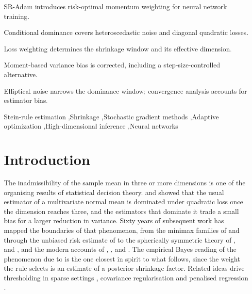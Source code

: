 \documentclass[a4paper,fleqn]{cas-dc}
\theoremstyle{plain}
\theoremstyle{definition}
\theoremstyle{remark}
\begin{document}
\begin{highlights}

\item SR-Adam introduces risk-optimal momentum weighting for neural network training.

\item Conditional dominance covers heteroscedastic noise and diagonal quadratic losses.

\item Loss weighting determines the shrinkage window and its effective dimension.

\item Moment-based variance bias is corrected, including a step-size-controlled alternative.

\item Elliptical noise narrows the dominance window; convergence analysis accounts for estimator bias.

\end{highlights}
\begin{keywords}
Stein-rule estimation \sep Shrinkage \sep Stochastic gradient methods \sep Adaptive optimization \sep High-dimensional inference \sep Neural networks
\end{keywords}

\maketitle


\section{Introduction}
\label{sec:introduction}

The inadmissibility of the sample mean in three or more dimensions is one of the organising results of statistical decision theory. \citet{stein1956} and \citet{james1961} showed that the usual estimator of a multivariate normal mean is dominated under quadratic loss once the dimension reaches three, and the estimators that dominate it trade a small bias for a larger reduction in variance. Sixty years of subsequent work has mapped the boundaries of that phenomenon, from the minimax families of \citet{baranchik1970} and \citet{bock1975} through the unbiased risk estimate of \citet{stein1981} to the spherically symmetric theory of \citet{strawderman1974}, \citet{brandwein1990,brandwein2012} and \citet{cellier1995,cellier1995b}, and the modern accounts of \citet{berger1985}, \citet{lehmann1998}, \citet{fourdrinier2018} and \citet{saleh2006}. The empirical Bayes reading of the phenomenon due to \citet{efronmorris1973,efronmorris1976,efron2012} is the one closest in spirit to what follows, since the weight the rule selects is an estimate of a posterior shrinkage factor. Related ideas drive thresholding in sparse settings \citep{donoho1994}, covariance regularisation \citep{ledoit2004} and penalised regression \citep{saleh2019}.
\end{document}
